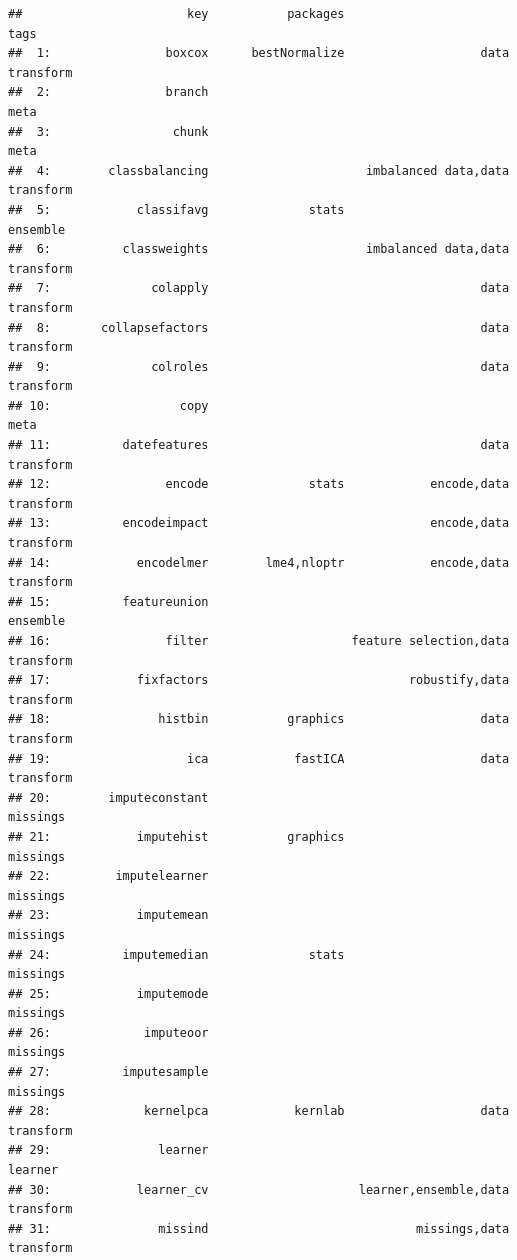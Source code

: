 \documentclass[
]{scrbook}
\begin{document}
\begin{verbatim}
##                       key           packages                             tags
##  1:                boxcox      bestNormalize                   data transform
##  2:                branch                                                meta
##  3:                 chunk                                                meta
##  4:        classbalancing                      imbalanced data,data transform
##  5:            classifavg              stats                         ensemble
##  6:          classweights                      imbalanced data,data transform
##  7:              colapply                                      data transform
##  8:       collapsefactors                                      data transform
##  9:              colroles                                      data transform
## 10:                  copy                                                meta
## 11:          datefeatures                                      data transform
## 12:                encode              stats            encode,data transform
## 13:          encodeimpact                               encode,data transform
## 14:            encodelmer        lme4,nloptr            encode,data transform
## 15:          featureunion                                            ensemble
## 16:                filter                    feature selection,data transform
## 17:            fixfactors                            robustify,data transform
## 18:               histbin           graphics                   data transform
## 19:                   ica            fastICA                   data transform
## 20:        imputeconstant                                            missings
## 21:            imputehist           graphics                         missings
## 22:         imputelearner                                            missings
## 23:            imputemean                                            missings
## 24:          imputemedian              stats                         missings
## 25:            imputemode                                            missings
## 26:             imputeoor                                            missings
## 27:          imputesample                                            missings
## 28:             kernelpca            kernlab                   data transform
## 29:               learner                                             learner
## 30:            learner_cv                     learner,ensemble,data transform
## 31:               missind                             missings,data transform

\end{verbatim}
\end{document}
